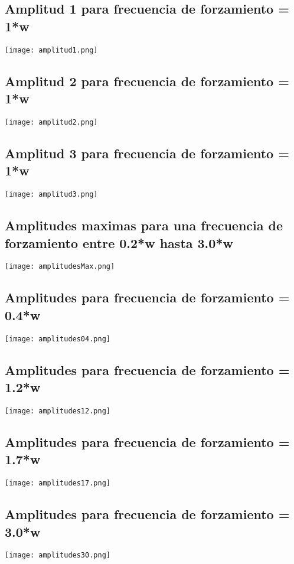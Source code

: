 \documentclass[11pt,letterpaper]{exam}
\begin{document}
\subsection{ Amplitud 1 para frecuencia de forzamiento = 1*w}
\texttt{[image: amplitud1.png]}
\subsection{ Amplitud 2 para frecuencia de forzamiento = 1*w}
\texttt{[image: amplitud2.png]}
\subsection{ Amplitud 3 para frecuencia de forzamiento = 1*w}
\texttt{[image: amplitud3.png]}

\subsection{ Amplitudes maximas para una frecuencia de forzamiento entre 0.2*w hasta 3.0*w}
\texttt{[image: amplitudesMax.png]}
\subsection{ Amplitudes para frecuencia de forzamiento = 0.4*w}
\texttt{[image: amplitudes04.png]}
\subsection{ Amplitudes para frecuencia de forzamiento = 1.2*w}
\texttt{[image: amplitudes12.png]}
\subsection{ Amplitudes para frecuencia de forzamiento = 1.7*w}
\texttt{[image: amplitudes17.png]}
\subsection{ Amplitudes para frecuencia de forzamiento = 3.0*w}
\texttt{[image: amplitudes30.png]}
\end{document}
